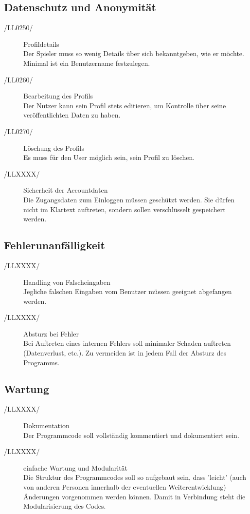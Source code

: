 \documentclass[11pt,a4paper]{scrreprt}
\begin{document}
\subsection{Datenschutz und Anonymität}
\begin{description}
\item[/LL0250/] Profildetails \\
Der Spieler muss so wenig Details über sich bekanntgeben, wie er möchte. Minimal ist ein Benutzername festzulegen.
\item[/LL0260/] Bearbeitung des Profils \\ 
Der Nutzer kann sein Profil stets editieren, um Kontrolle über seine veröffentlichten Daten zu haben.
\item[/LL0270/] Löschung des Profils \\ 
Es muss für den User möglich sein, sein Profil zu löschen.
\item[/LLXXXX/] Sicherheit der Accountdaten \ \\
Die Zugangsdaten zum Einloggen müssen geschützt werden. Sie dürfen nicht im Klartext auftreten, sondern sollen verschlüsselt gespeichert werden.
\end{description}
\subsection{Fehlerunanfälligkeit}
\begin{description}
\item[/LLXXXX/] Handling von Falscheingaben \ \\
Jegliche falschen Eingaben vom Benutzer müssen geeignet abgefangen werden.
\item[/LLXXXX/] Absturz bei Fehler \ \\
Bei Auftreten eines internen Fehlers soll minimaler Schaden auftreten (Datenverlust, etc.). Zu vermeiden ist in jedem Fall der Absturz des Programms.
\end{description}
\subsection{Wartung}
\begin{description}
\item[/LLXXXX/] Dokumentation \ \\
Der Programmcode soll vollständig kommentiert und dokumentiert sein.
\item[/LLXXXX/] einfache Wartung und Modularität \ \\
Die Struktur des Programmcodes soll so aufgebaut sein, dass 'leicht' (auch von anderen Personen innerhalb der eventuellen Weiterentwicklung) Änderungen vorgenommen werden können. Damit in Verbindung steht die Modularisierung des Codes.
\end{description}
\end{document}
